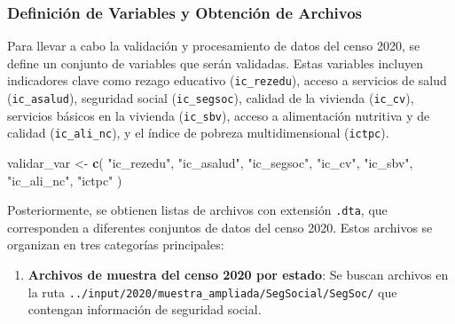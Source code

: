 \documentclass[
  12pt,
]{book}
\newenvironment{Shaded}{\begin{snugshade}}{\end{snugshade}}
\newcommand{\AttributeTok}[1]{\textcolor[rgb]{0.13,0.29,0.53}{#1}}
\newcommand{\ConstantTok}[1]{\textcolor[rgb]{0.56,0.35,0.01}{#1}}
\newcommand{\FunctionTok}[1]{\textcolor[rgb]{0.13,0.29,0.53}{\textbf{#1}}}
\newcommand{\NormalTok}[1]{#1}
\newcommand{\OtherTok}[1]{\textcolor[rgb]{0.56,0.35,0.01}{#1}}
\newcommand{\StringTok}[1]{\textcolor[rgb]{0.31,0.60,0.02}{#1}}
\providecommand{\tightlist}{%
  \setlength{\itemsep}{0pt}\setlength{\parskip}{0pt}}
\begin{document}
\hypertarget{definiciuxf3n-de-variables-y-obtenciuxf3n-de-archivos}{%
\subsubsection*{Definición de Variables y Obtención de Archivos}\label{definiciuxf3n-de-variables-y-obtenciuxf3n-de-archivos}}

Para llevar a cabo la validación y procesamiento de datos del censo 2020, se define un conjunto de variables que serán validadas. Estas variables incluyen indicadores clave como rezago educativo (\texttt{ic\_rezedu}), acceso a servicios de salud (\texttt{ic\_asalud}), seguridad social (\texttt{ic\_segsoc}), calidad de la vivienda (\texttt{ic\_cv}), servicios básicos en la vivienda (\texttt{ic\_sbv}), acceso a alimentación nutritiva y de calidad (\texttt{ic\_ali\_nc}), y el índice de pobreza multidimensional (\texttt{ictpc}).

\begin{Shaded}
\begin{Highlighting}[]
\NormalTok{validar\_var }\OtherTok{\textless{}{-}} \FunctionTok{c}\NormalTok{(}
  \StringTok{"ic\_rezedu"}\NormalTok{,}
  \StringTok{"ic\_asalud"}\NormalTok{,}
  \StringTok{"ic\_segsoc"}\NormalTok{,}
  \StringTok{"ic\_cv"}\NormalTok{,}
  \StringTok{"ic\_sbv"}\NormalTok{,}
  \StringTok{"ic\_ali\_nc"}\NormalTok{,}
  \StringTok{"ictpc"}
\NormalTok{)}
\end{Highlighting}
\end{Shaded}

Posteriormente, se obtienen listas de archivos con extensión \texttt{.dta}, que corresponden a diferentes conjuntos de datos del censo 2020. Estos archivos se organizan en tres categorías principales:

\begin{enumerate}
\def\labelenumi{\arabic{enumi}.}
\tightlist
\item
  \textbf{Archivos de muestra del censo 2020 por estado}: Se buscan archivos en la ruta \texttt{../input/2020/muestra\_ampliada/SegSocial/SegSoc/} que contengan información de seguridad social.
\end{enumerate}

\begin{Shaded}
\end{Shaded}
\end{document}
